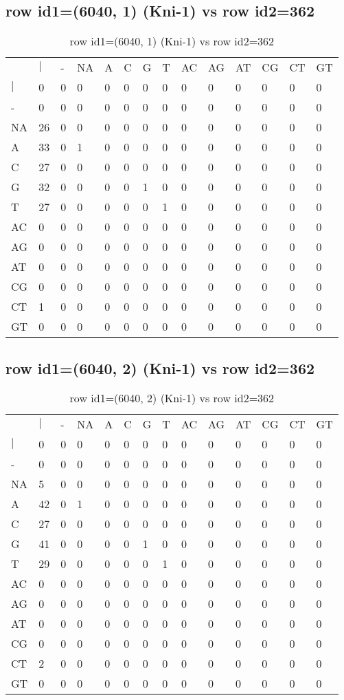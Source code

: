 \subsection{row id1=(6040, 1) (Kni-1) vs row id2=362}
\begin{center}
\begin{longtable}{|l|l|l|l|l|l|l|l|l|l|l|l|l|l|}
\caption{row id1=(6040, 1) (Kni-1) vs row id2=362} \label{table_dm26}\\
\hline
\\
\hline
&$|$&-&NA&A&C&G&T&AC&AG&AT&CG&CT&GT\\
$|$&0&0&0&0&0&0&0&0&0&0&0&0&0\\
-&0&0&0&0&0&0&0&0&0&0&0&0&0\\
NA&26&0&0&0&0&0&0&0&0&0&0&0&0\\
A&33&0&1&0&0&0&0&0&0&0&0&0&0\\
C&27&0&0&0&0&0&0&0&0&0&0&0&0\\
G&32&0&0&0&0&1&0&0&0&0&0&0&0\\
T&27&0&0&0&0&0&1&0&0&0&0&0&0\\
AC&0&0&0&0&0&0&0&0&0&0&0&0&0\\
AG&0&0&0&0&0&0&0&0&0&0&0&0&0\\
AT&0&0&0&0&0&0&0&0&0&0&0&0&0\\
CG&0&0&0&0&0&0&0&0&0&0&0&0&0\\
CT&1&0&0&0&0&0&0&0&0&0&0&0&0\\
GT&0&0&0&0&0&0&0&0&0&0&0&0&0\\
\hline
\end{longtable}
\end{center}

\subsection{row id1=(6040, 2) (Kni-1) vs row id2=362}
\begin{center}
\begin{longtable}{|l|l|l|l|l|l|l|l|l|l|l|l|l|l|}
\caption{row id1=(6040, 2) (Kni-1) vs row id2=362} \label{table_dm28}\\
\hline
\\
\hline
&$|$&-&NA&A&C&G&T&AC&AG&AT&CG&CT&GT\\
$|$&0&0&0&0&0&0&0&0&0&0&0&0&0\\
-&0&0&0&0&0&0&0&0&0&0&0&0&0\\
NA&5&0&0&0&0&0&0&0&0&0&0&0&0\\
A&42&0&1&0&0&0&0&0&0&0&0&0&0\\
C&27&0&0&0&0&0&0&0&0&0&0&0&0\\
G&41&0&0&0&0&1&0&0&0&0&0&0&0\\
T&29&0&0&0&0&0&1&0&0&0&0&0&0\\
AC&0&0&0&0&0&0&0&0&0&0&0&0&0\\
AG&0&0&0&0&0&0&0&0&0&0&0&0&0\\
AT&0&0&0&0&0&0&0&0&0&0&0&0&0\\
CG&0&0&0&0&0&0&0&0&0&0&0&0&0\\
CT&2&0&0&0&0&0&0&0&0&0&0&0&0\\
GT&0&0&0&0&0&0&0&0&0&0&0&0&0\\
\hline
\end{longtable}
\end{center}


